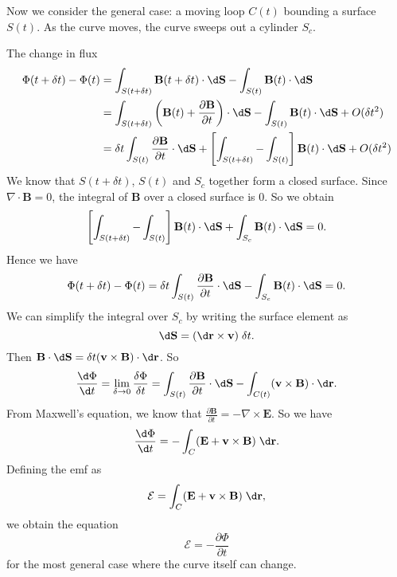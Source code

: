 \documentclass[a4paper]{article}
\begin{document}
Now we consider the general case: a moving loop $C(t)$ bounding a surface $S(t)$.  As the curve moves, the curve sweeps out a cylinder $S_c$.
\begin{center}
\end{center}
The change in flux
\begin{align*}
  \Phi(t + \delta t) - \Phi(t) &= \int_{S(t + \delta t)} \mathbf{B}(t + \delta t)\cdot \d \mathbf{S} - \int_{S(t)}\mathbf{B}(t)\cdot \d \mathbf{S}\\
  &= \int_{S(t + \delta t)}\left(\mathbf{B}(t) + \frac{\partial \mathbf{B}}{\partial t}\right)\cdot \d \mathbf{S} - \int_{S(t)}\mathbf{B}(t)\cdot \d \mathbf{S} + O(\delta t^2)\\
  &= \delta t\int_{S(t)}\frac{\partial \mathbf{B}}{\partial t}\cdot \d \mathbf{S} + \left[\int_{S(t + \delta t)} - \int_{S(t)}\right]\mathbf{B}(t)\cdot \d \mathbf{S} + O(\delta t^2)
\end{align*}
We know that $S(t + \delta t)$, $S(t)$ and $S_c$ together form a closed surface. Since $\nabla\cdot \mathbf{B} = 0$, the integral of $\mathbf{B}$ over a closed surface is $0$. So we obtain
\[
  \left[\int_{S(t + \delta t)} - \int_{S(t)}\right]\mathbf{B}(t)\cdot \d \mathbf{S} + \int_{S_c}\mathbf{B}(t)\cdot \d \mathbf{S} = 0.
\]
Hence we have
\[
  \Phi(t + \delta t) - \Phi(t) = \delta t\int_{S(t)}\frac{\partial \mathbf{B}}{\partial t}\cdot \d \mathbf{S} - \int_{S_c}\mathbf{B}(t)\cdot \d \mathbf{S} = 0.
\]
We can simplify the integral over $S_c$ by writing the surface element as
\[
  \d \mathbf{S} = (\d \mathbf{r}\times \mathbf{v})\;\delta t.
\]
Then $\mathbf{B}\cdot \d \mathbf{S} = \delta t(\mathbf{v}\times \mathbf{B}) \cdot \d \mathbf{r}$. So
\[
  \frac{\d \Phi}{\d t} = \lim_{\delta \to 0}\frac{\delta \Phi}{\delta t} = \int_{S(t)}\frac{\partial \mathbf{B}}{\partial t}\cdot \d \mathbf{S} - \int_{C(t)}(\mathbf{v}\times \mathbf{B})\cdot \d \mathbf{r}.
\]
From Maxwell's equation, we know that $\frac{\partial \mathbf{B}}{\partial t} = -\nabla \times \mathbf{E}$. So we have
\[
  \frac{\d \Phi}{\d t} = -\int_C (\mathbf{E} + \mathbf{v}\times \mathbf{B})\;\d \mathbf{r}.
\]
Defining the emf as
\[
  \mathcal{E} = \int_C (\mathbf{E} + \mathbf{v}\times \mathbf{B})\;\d \mathbf{r},
\]
we obtain the equation
\[
  \mathcal{E} = -\frac{\partial \Phi}{\partial t}
\]
for the most general case where the curve itself can change.
\end{document}
